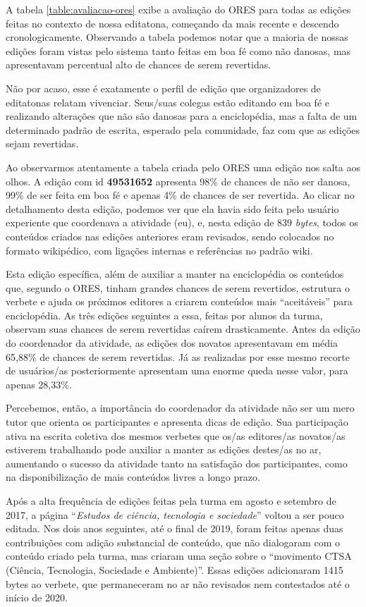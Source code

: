 A tabela \ref{table:avaliacao-ores} exibe a avaliação do ORES para todas as edições feitas no contexto de nossa editatona, começando da mais recente e descendo cronologicamente. Observando a tabela podemos notar que a maioria de nossas edições foram vistas pelo sistema tanto feitas em boa fé como não danosas, mas apresentavam percentual alto de chances de serem revertidas.

Não por acaso, esse é exatamente o perfil de edição que organizadores de editatonas relatam vivenciar. Seus/suas colegas estão editando em boa fé e realizando alterações que não são danosas para a enciclopédia, mas a falta de um determinado padrão de escrita, esperado pela comunidade, faz com que as edições sejam revertidas.

Ao observarmos atentamente a tabela criada pelo ORES uma edição nos salta aos olhos. A edição com id \textbf{49531652} apresenta 98\% de chances de não ser danosa, 99\% de ser feita em boa fé e apenas 4\% de chances de ser revertida. Ao clicar no detalhamento desta edição, podemos ver que ela havia sido feita pelo usuário experiente que coordenava a atividade (eu), e, nesta edição de 839 \textit{bytes}, todos os conteúdos criados nas edições anteriores eram revisados, sendo colocados no formato wikipédico, com ligações internas e referências no padrão wiki.

Esta edição específica, além de auxiliar a manter na enciclopédia os conteúdos que, segundo o ORES, tinham grandes chances de serem revertidos, estrutura o verbete e ajuda os próximos editores a criarem conteúdos mais ``aceitáveis'' para enciclopédia. As três edições seguintes a essa, feitas por alunos da turma, observam suas chances de serem revertidas caírem drasticamente. Antes da edição do coordenador da atividade, as edições dos novatos apresentavam em média 65,88\% de chances de serem revertidas. Já as realizadas por esse mesmo recorte de usuários/as posteriormente apresentam uma enorme queda nesse valor, para apenas 28,33\%.

Percebemos, então, a importância do coordenador da atividade não ser um mero tutor que orienta os participantes e apresenta dicas de edição. Sua participação ativa na escrita coletiva dos mesmos verbetes que os/as editores/as novatos/as estiverem trabalhando pode auxiliar a manter as edições destes/as no ar, aumentando o sucesso da atividade tanto na satisfação dos participantes, como na disponibilização de mais conteúdos livres a longo prazo.

Após a alta frequência de edições feitas pela turma em agosto e setembro de 2017, a página ``\textit{Estudos de ciência, tecnologia e sociedade}'' voltou a ser pouco editada. Nos dois anos seguintes, até o final de 2019, foram feitas apenas duas contribuições com adição substancial de conteúdo, que não dialogaram com o conteúdo criado pela turma, mas criaram uma seção sobre o ``movimento CTSA (Ciência, Tecnologia, Sociedade e Ambiente)''. Essas edições adicionaram 1415 bytes ao verbete, que permaneceram no ar não revisados nem contestados até o início de 2020.

